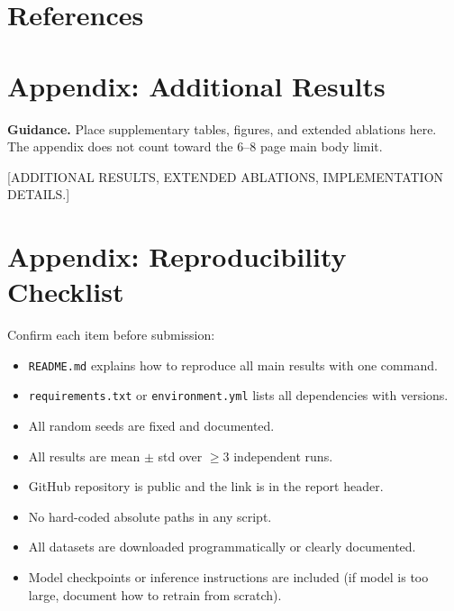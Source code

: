 \documentclass[11pt, letterpaper]{article}
\begin{document}
\section{References}

\begin{enumerate}[label={[\arabic*]},leftmargin=*]
  \item [Author(s), Year. ``Title.'' \textit{Venue}. arXiv:XXXX.XXXXX]
  \item [\ldots]
\end{enumerate}

\appendix

\section{Appendix: Additional Results}

\begin{guidancebox}
\textbf{Guidance.} Place supplementary tables, figures, and extended ablations
here. The appendix does not count toward the 6--8 page main body limit.
\end{guidancebox}

[ADDITIONAL RESULTS, EXTENDED ABLATIONS, IMPLEMENTATION DETAILS.]

\section{Appendix: Reproducibility Checklist}

Confirm each item before submission:

\begin{itemize}[noitemsep]
  \item[$\square$] \texttt{README.md} explains how to reproduce all main results with one command.
  \item[$\square$] \texttt{requirements.txt} or \texttt{environment.yml} lists all dependencies with versions.
  \item[$\square$] All random seeds are fixed and documented.
  \item[$\square$] All results are mean $\pm$ std over $\geq$3 independent runs.
  \item[$\square$] GitHub repository is public and the link is in the report header.
  \item[$\square$] No hard-coded absolute paths in any script.
  \item[$\square$] All datasets are downloaded programmatically or clearly documented.
  \item[$\square$] Model checkpoints or inference instructions are included (if model is too large, document how to retrain from scratch).
\end{itemize}
\end{document}
